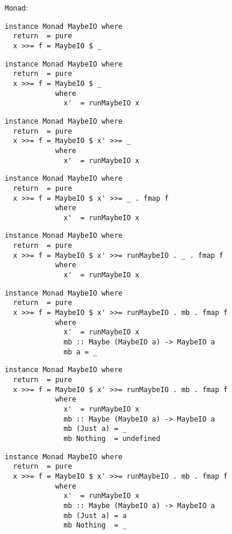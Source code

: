 \documentclass{beamer}
\begin{document}
\begin{frame}[fragile]
\texttt{Monad}:
\begin{overprint}
\begin{verbatim}
instance Monad MaybeIO where
  return  = pure
  x >>= f = MaybeIO $ _
\end{verbatim}
\begin{verbatim}
instance Monad MaybeIO where
  return  = pure
  x >>= f = MaybeIO $ _
            where
              x'  = runMaybeIO x
\end{verbatim}
\begin{verbatim}
instance Monad MaybeIO where
  return  = pure
  x >>= f = MaybeIO $ x' >>= _
            where
              x'  = runMaybeIO x
\end{verbatim}
\begin{verbatim}
instance Monad MaybeIO where
  return  = pure
  x >>= f = MaybeIO $ x' >>= _ . fmap f
            where
              x'  = runMaybeIO x
\end{verbatim}
\begin{verbatim}
instance Monad MaybeIO where
  return  = pure
  x >>= f = MaybeIO $ x' >>= runMaybeIO . _ . fmap f
            where
              x'  = runMaybeIO x
\end{verbatim}
\begin{verbatim}
instance Monad MaybeIO where
  return  = pure
  x >>= f = MaybeIO $ x' >>= runMaybeIO . mb . fmap f
            where
              x'  = runMaybeIO x
              mb :: Maybe (MaybeIO a) -> MaybeIO a
              mb a = _
\end{verbatim}
\begin{verbatim}
instance Monad MaybeIO where
  return  = pure
  x >>= f = MaybeIO $ x' >>= runMaybeIO . mb . fmap f
            where
              x'  = runMaybeIO x
              mb :: Maybe (MaybeIO a) -> MaybeIO a
              mb (Just a) = _
              mb Nothing  = undefined
\end{verbatim}
\begin{verbatim}
instance Monad MaybeIO where
  return  = pure
  x >>= f = MaybeIO $ x' >>= runMaybeIO . mb . fmap f
            where
              x'  = runMaybeIO x
              mb :: Maybe (MaybeIO a) -> MaybeIO a
              mb (Just a) = a
              mb Nothing  = _
\end{verbatim}
\begin{verbatim}

\end{verbatim}
\end{overprint}
\end{frame}
\end{document}
